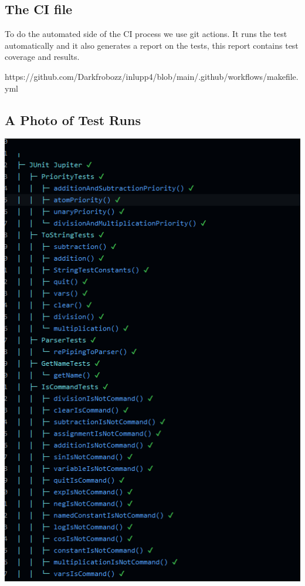 \documentclass{article}
\begin{document}
\subsection{The CI file}
To do the automated side of the CI process we use git actions. 
It runs the test automatically and
it also generates a report on the tests, this report contains test coverage and results.

https://github.com/Darkfrobozz/inlupp4/blob/main/.github/workflows/makefile.yml

\subsection{A Photo of Test Runs}
\includegraphics[width=\linewidth]{Screenshot 2023-11-29 161454.png}
\end{document}
